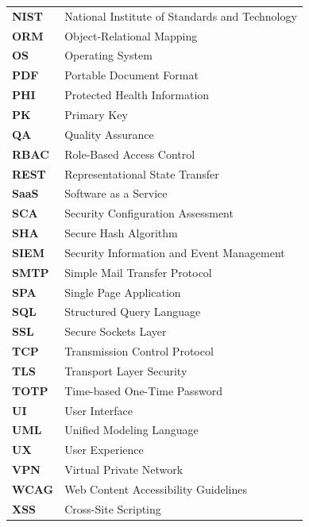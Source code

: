\documentclass[11pt,a4paper,oneside,openright]{report}
\begin{document}
\begin{longtable}{@{}p{3cm} p{12cm}@{}}
\textbf{NIST} & National Institute of Standards and Technology \\
\textbf{ORM} & Object-Relational Mapping \\
\textbf{OS} & Operating System \\
\textbf{PDF} & Portable Document Format \\
\textbf{PHI} & Protected Health Information \\
\textbf{PK} & Primary Key \\
\textbf{QA} & Quality Assurance \\
\textbf{RBAC} & Role-Based Access Control \\
\textbf{REST} & Representational State Transfer \\
\textbf{SaaS} & Software as a Service \\
\textbf{SCA} & Security Configuration Assessment \\
\textbf{SHA} & Secure Hash Algorithm \\
\textbf{SIEM} & Security Information and Event Management \\
\textbf{SMTP} & Simple Mail Transfer Protocol \\
\textbf{SPA} & Single Page Application \\
\textbf{SQL} & Structured Query Language \\
\textbf{SSL} & Secure Sockets Layer \\
\textbf{TCP} & Transmission Control Protocol \\
\textbf{TLS} & Transport Layer Security \\
\textbf{TOTP} & Time-based One-Time Password \\
\textbf{UI} & User Interface \\
\textbf{UML} & Unified Modeling Language \\
\textbf{UX} & User Experience \\
\textbf{VPN} & Virtual Private Network \\
\textbf{WCAG} & Web Content Accessibility Guidelines \\
\textbf{XSS} & Cross-Site Scripting \\
\end{longtable}

\newpage
{}









\newpage
\appendix


\newpage
{}
{}


\end{document}
